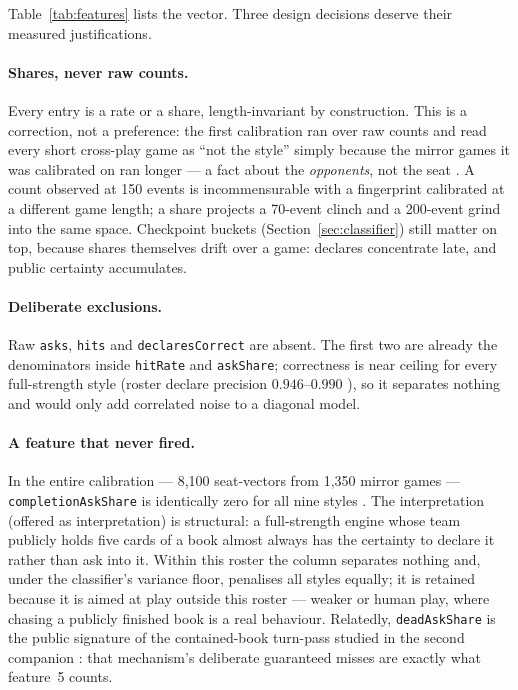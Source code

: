 \documentclass[11pt]{article}
\newcommand{\code}[1]{\texttt{#1}}
\begin{document}
Table~\ref{tab:features} lists the vector. Three design decisions deserve their measured
justifications.

\paragraph{Shares, never raw counts.} Every entry is a rate or a share, length-invariant by
construction. This is a correction, not a preference: the first calibration ran over raw
counts and read every short cross-play game as ``not the style'' simply because the mirror
games it was calibrated on ran longer --- a fact about the \emph{opponents}, not the seat
\cite{repo}. A count observed at 150 events is incommensurable with a fingerprint calibrated
at a different game length; a share projects a 70-event clinch and a 200-event grind into the
same space. Checkpoint buckets (Section~\ref{sec:classifier}) still matter on top, because
shares themselves drift over a game: declares concentrate late, and public certainty
accumulates.

\paragraph{Deliberate exclusions.} Raw \code{asks}, \code{hits} and \code{declaresCorrect}
are absent. The first two are already the denominators inside \code{hitRate} and
\code{askShare}; correctness is near ceiling for every full-strength style (roster declare
precision $0.946$--$0.990$ \cite{v05}), so it separates nothing and would only add
correlated noise to a diagonal model.

\paragraph{A feature that never fired.} In the entire calibration --- 8{,}100 seat-vectors
from 1{,}350 mirror games --- \code{completionAskShare} is identically zero for all nine
styles \cite{fingerprints}. The interpretation (offered as interpretation) is structural: a
full-strength engine whose team publicly holds five cards of a book almost always has the
certainty to declare it rather than ask into it. Within this roster the column separates
nothing and, under the classifier's variance floor, penalises all styles equally; it is
retained because it is aimed at play outside this roster --- weaker or human play, where
chasing a publicly finished book is a real behaviour. Relatedly, \code{deadAskShare} is the
public signature of the contained-book turn-pass studied in the second companion
\cite{containedpaper}: that mechanism's deliberate guaranteed misses are exactly what
feature~5 counts.
\end{document}
